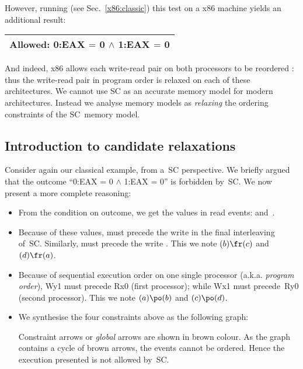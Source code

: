 However, running (see Sec.~\ref{x86:classic})
this test on a x86 machine yields an additional result:
\begin{center}
\begin{tabular}{|l|}
\hline
Allowed: \mbox{0:EAX} $\mathord{=}$ \mbox{0} $\wedge$ \mbox{1:EAX} $\mathord{=}$ \mbox{0}\\\hline
\end{tabular}
\end{center}

And indeed, x86 allows each write-read pair on both processors to be
reordered \cite{intel:white}: thus the write-read pair in program order is relaxed on each of these
architectures. We cannot use SC as an accurate memory model for modern
architectures.
Instead we analyse memory models as  \emph{relaxing} the
ordering constraints of the SC~memory model.


\subsection{Introduction\label{candidate:intro} to candidate relaxations}
Consider again our classical example,
from a~SC perspective.
We briefly argued that the outcome
``\mbox{0:EAX} $\mathord{=}$ \mbox{0} $\wedge$
\mbox{1:EAX} $\mathord{=}$ \mbox{0}''
is forbidden by~SC.
We now present a more complete reasoning:
\begin{itemize}
\item From the condition on outcome, we get the values in
read events:  and~.
\item Because of these values,
 must precede the write 
in the final interleaving of~SC.
Similarly,   must precede the write .
This we note $(b) \fr (c)$ and $(d) \fr (a)$.

\item Because of sequential execution order on one single processor
(a.k.a. \emph{program order}),
Wy1 must precede Rx0 (first processor);
while Wx1 must precede~Ry0 (second processor).
This we note  $(a) \po (b)$ and $(c) \po (d)$.

\item We synthesise the four constraints  above as the following graph:
\begin{center}
\end{center}
Constraint arrows or \emph{global} arrows are shown in brown colour.
As the graph contains a cycle of brown arrows, the events cannot be ordered.
Hence the execution presented is not allowed by~SC.
\end{itemize}

